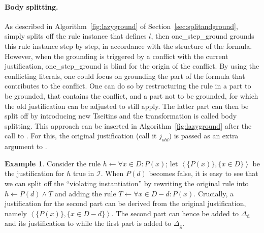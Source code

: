 \documentclass[11pt]{article}
\newcommand{\m}[1]{\ensuremath{#1}\xspace}
\newcommand{\lrule}{\m{\leftarrow}}
\newcommand{\I}{\m{\mathcal{I}}}
\newcommand{\D}{\m{\Delta}}
\newcommand{\typed}[2]{\m{#1\in #2:}}
\newcommand{\tuple}[1]{\m{\left \langle #1 \right \rangle }}
\theoremstyle{plain}
\theoremstyle{definition}
\theoremstyle{example_basic}
\newtheorem{example}[thm]{Example}
\theoremstyle{example_contd}
\theoremstyle{plain}
\newcommand{\groundone}{\textsf{one\_step\_ground}\xspace}
\newcommand{\Dg}{\ensuremath{\D_\text{g}}\xspace}
\newcommand{\Dd}{\ensuremath{\D_\text{d}}\xspace}
\newcommand{\change}[1]{#1}
\begin{document}
\paragraph{Body splitting.}
\change{As described in Algorithm~\ref{fig:lazyground} of
  Section~\ref{sec:splitandground}, \csplit simply splits off the rule
  instance that defines $l$, then \groundone grounds this rule
  instance step by step, in accordance with the structure of the
  formula. However, when the grounding is triggered by a conflict with
  the current justification, \groundone is blind for the origin of the
  conflict. By using the conflicting literals, one could focus on
  grounding the part of the formula that contributes to the
  conflict. One can do so by restructuring the rule in a part to be
  grounded, that contains the conflict, and a part not to be grounded,
  for which the old justification can be adjusted to still apply. The latter part can then
  be split off by introducing new Tseitins and the transformation
  is called body splitting. This approach can be inserted in
  Algorithm~\ref{fig:lazyground} after the call to \csplit. For this, the original justification (call it $j_{old}$) is passed as an extra argument to \splitandground.}

\begin{example}
Consider the rule $h \lrule \forall \typed{x}{D} P(x)$; let $\tuple{\{P(x)\},\{x\in D\}}$ be the justification  for $h$ true in \I.
When $P(d)$
becomes \change{false}, it is easy to see that we can split off the ``violating
instantiation'' by rewriting the original rule into $h \lrule P(d) \land T$
and adding the rule $T\lrule \forall \typed{x}{D-d} P(x)$. Crucially, a
justification for the  \change{second part}
can be derived from the original justification,
namely  $\tuple{\{P(x)\},\{x\in D-d\}}$. 
The  \change{second part} can hence be added to \Dd and its justification to
\jgraph while the \change{first part is added to $\Dg$}.
\end{example}
\end{document}
